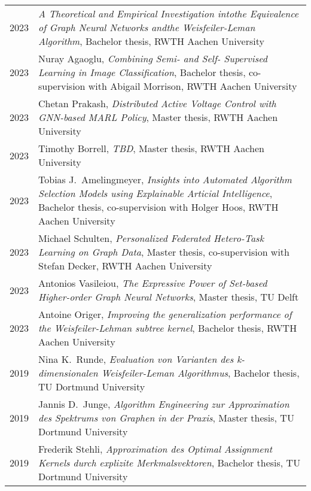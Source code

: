 \documentclass[10pt, a4paper, DIV=14, headings=small]{scrartcl}
\begin{document}
\begin{longtabu}{p{2.1cm}p{12.0cm}}
	2023 & \emph{A Theoretical and Empirical Investigation intothe Equivalence of Graph Neural Networks andthe Weisfeiler-Leman Algorithm}, Bachelor thesis, RWTH Aachen University                                                     \\
	2023 & Nuray Agaoglu, \emph{Combining Semi- and Self- Supervised Learning in Image Classification}, Bachelor thesis, co-supervision with Abigail Morrison, RWTH Aachen University\\  
	2023 & Chetan Prakash, \emph{Distributed Active Voltage Control with GNN-based MARL Policy}, Master thesis, RWTH Aachen University\\  
	2023 & Timothy Borrell, \emph{TBD}, Master thesis, RWTH Aachen University\\
	2023 & Tobias J.\ Amelingmeyer, \emph{Insights into Automated Algorithm Selection Models using Explainable Articial Intelligence}, Bachelor thesis, co-supervision with Holger Hoos, RWTH Aachen University \\
	2023 & Michael Schulten, \emph{Personalized Federated Hetero-Task Learning on Graph Data}, Master thesis, co-supervision with Stefan Decker, RWTH Aachen University                                         \\
	2023 & Antonios Vasileiou, \emph{The Expressive Power of Set-based Higher-order Graph Neural Networks}, Master thesis, TU Delft                                                                             \\
	2023 & Antoine Origer, \emph{Improving the generalization performance of the Weisfeiler-Lehman subtree kernel}, Bachelor thesis, RWTH Aachen University                                                     \\
	2019 & Nina K.\ Runde, \emph{Evaluation von Varianten des k-dimensionalen Weisfeiler-Leman Algorithmus}, Bachelor thesis, TU Dortmund University                                                            \\
	2019 & Jannis D.\ Junge, \emph{Algorithm Engineering zur Approximation des Spektrums von Graphen in der Praxis}, Master thesis, TU Dortmund University                                                      \\
	2019 & Frederik Stehli, \emph{Approximation des Optimal Assignment Kernels durch explizite Merkmalsvektoren}, Bachelor thesis, TU Dortmund University                                                       \\

\end{longtabu}
\end{document}
